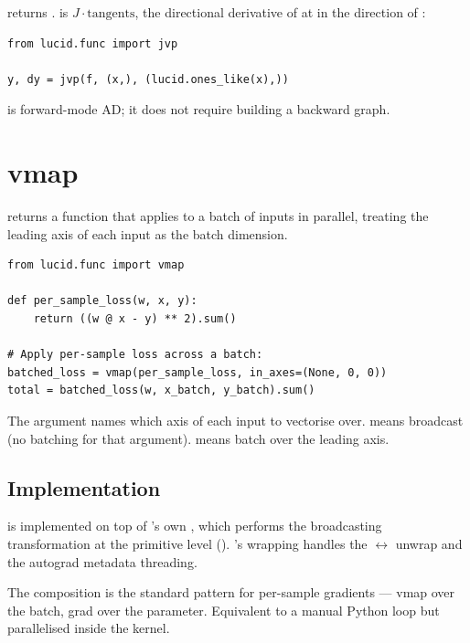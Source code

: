  returns .  is $J \cdot \text{tangents}$, the
directional derivative of  at  in the
direction of :

\begin{lstlisting}[style=lucid,language=LucidPython]
from lucid.func import jvp

y, dy = jvp(f, (x,), (lucid.ones_like(x),))
\end{lstlisting}

 is forward-mode AD; it does not require building a
backward graph.

\section{vmap}
\label{sec:higher_order:vmap}

 returns a function that applies  to a
batch of inputs in parallel, treating the leading axis of each
input as the batch dimension.

\begin{lstlisting}[style=lucid,language=LucidPython]
from lucid.func import vmap

def per_sample_loss(w, x, y):
    return ((w @ x - y) ** 2).sum()

# Apply per-sample loss across a batch:
batched_loss = vmap(per_sample_loss, in_axes=(None, 0, 0))
total = batched_loss(w, x_batch, y_batch).sum()
\end{lstlisting}

The  argument names which axis of each input to
vectorise over.  means broadcast (no batching for that
argument).  means batch over the leading axis.

\subsection{Implementation}
\label{ssec:higher_order:vmap_impl}

 is implemented on top of \MLX's own , which
performs the broadcasting transformation at the primitive level
(). \Lucid's wrapping handles the
 $\leftrightarrow$  unwrap and
the autograd metadata threading.

The composition  is the standard pattern for
per-sample gradients --- vmap over the batch, grad over the
parameter. Equivalent to a manual Python loop but parallelised
inside the kernel.

